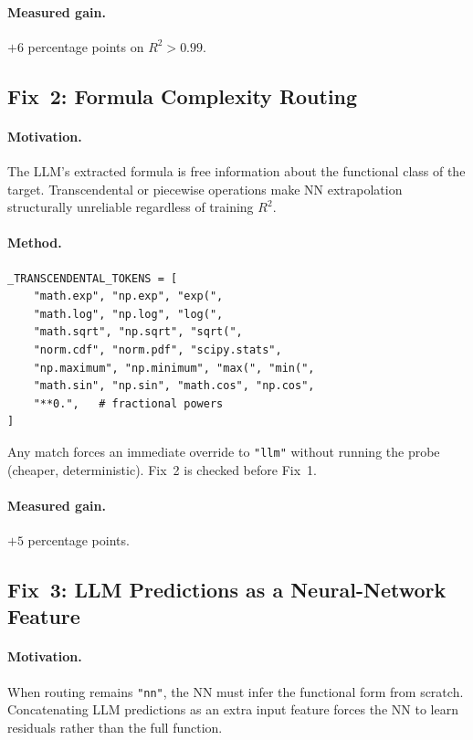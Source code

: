\documentclass[11pt,a4paper]{article}
\begin{document}
\paragraph{Measured gain.} $+6$ percentage points on $R^2 > 0.99$.

\subsection{Fix~2: Formula Complexity Routing}

\paragraph{Motivation.}
The LLM's extracted formula is free information about the functional class of
the target.  Transcendental or piecewise operations make NN extrapolation
structurally unreliable regardless of training $R^2$.

\paragraph{Method.}

\begin{lstlisting}[caption={Transcendental token list.}]
_TRANSCENDENTAL_TOKENS = [
    "math.exp", "np.exp", "exp(",
    "math.log", "np.log", "log(",
    "math.sqrt", "np.sqrt", "sqrt(",
    "norm.cdf", "norm.pdf", "scipy.stats",
    "np.maximum", "np.minimum", "max(", "min(",
    "math.sin", "np.sin", "math.cos", "np.cos",
    "**0.",   # fractional powers
]
\end{lstlisting}

Any match forces an immediate override to \texttt{"llm"} without running the
probe (cheaper, deterministic).  Fix~2 is checked before Fix~1.

\paragraph{Measured gain.} $+5$ percentage points.

\subsection{Fix~3: LLM Predictions as a Neural-Network Feature}

\paragraph{Motivation.}
When routing remains \texttt{"nn"}, the NN must infer the functional form from
scratch.  Concatenating LLM predictions as an extra input feature forces the
NN to learn residuals rather than the full function.
\end{document}
